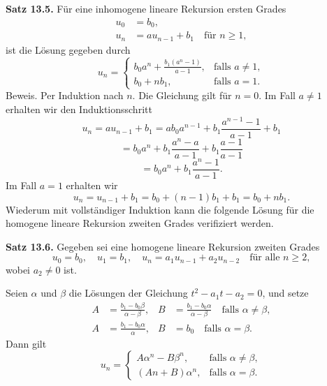 \documentclass[9pt]{article}
\begin{document}
\textbf{Satz 13.5.} Für eine inhomogene lineare Rekursion ersten Grades
\begin{align*}
    u_0 &= b_0, \\
    u_n &= a u_{n-1} + b_1 \quad \text{für } n \geq 1,
\end{align*}
ist die Lösung gegeben durch
\begin{equation*}
    u_n = \begin{cases}
        b_0 a^n + \frac{b_1 (a^n - 1)}{a - 1}, & \text{falls } a \neq 1, \\
        b_0 + n b_1, & \text{falls } a = 1.
    \end{cases}
\end{equation*}
Beweis. Per Induktion nach \( n \). Die Gleichung gilt für \( n = 0 \).  
Im Fall \( a \neq 1 \) erhalten wir den Induktionsschritt  
\[
u_n = a u_{n-1} + b_1 = a b_0 a^{n-1} + b_1 \frac{a^{n-1} - 1}{a - 1} + b_1
\]
\[
= b_0 a^n + b_1 \frac{a^n - a}{a - 1} + b_1 \frac{a - 1}{a - 1}
\]
\[
= b_0 a^n + b_1 \frac{a^n - 1}{a - 1}.
\]
Im Fall \( a = 1 \) erhalten wir  
\[
u_n = u_{n-1} + b_1 = b_0 + (n - 1) b_1 + b_1 = b_0 + n b_1.
\]
Wiederum mit vollständiger Induktion kann die folgende Lösung für die  
homogene lineare Rekursion zweiten Grades verifiziert werden.

\textbf{Satz 13.6.} Gegeben sei eine homogene lineare Rekursion zweiten Grades
\begin{equation*}
    u_0 = b_0, \quad u_1 = b_1, \quad u_n = a_1 u_{n-1} + a_2 u_{n-2} \quad \text{für alle } n \geq 2,
\end{equation*}
wobei $a_2 \neq 0$ ist. 

Seien $\alpha$ und $\beta$ die Lösungen der Gleichung $t^2 - a_1 t - a_2 = 0$, und setze
\begin{align*}
    A &= \frac{b_1 - b_0 \beta}{\alpha - \beta}, & B &= \frac{b_1 - b_0 \alpha}{\alpha - \beta} \quad \text{falls } \alpha \neq \beta, \\
    A &= \frac{b_1 - b_0 \alpha}{\alpha}, & B &= b_0 \quad \text{falls } \alpha = \beta.
\end{align*}
Dann gilt
\begin{equation*}
    u_n = \begin{cases}
        A \alpha^n - B \beta^n, & \text{falls } \alpha \neq \beta, \\
        (A n + B) \alpha^n, & \text{falls } \alpha = \beta.
    \end{cases}
\end{equation*}
\end{document}

